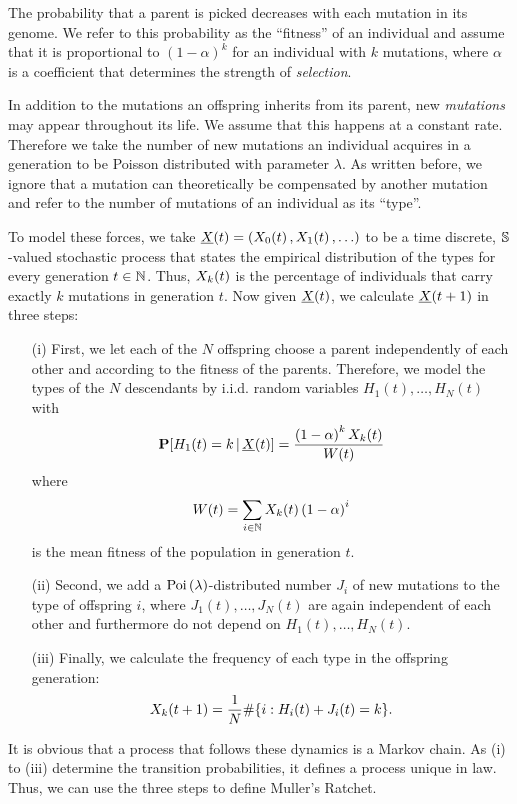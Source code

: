 The probability that a parent is picked decreases with each mutation in its genome. We refer to
this probability as the ``fitness'' of an individual and assume that it is proportional to
$(1-\alpha)^k$ for an individual with $k$ mutations, where $\alpha$ is a coefficient that determines
the strength of \emph{selection}.

In addition to the mutations an offspring inherits from its parent, new
\emph{mutations} may appear throughout its life. We assume that this happens at a constant rate. Therefore we take the
number of new mutations an individual acquires in a generation to be Poisson distributed with
parameter $\lambda$. As written before, we ignore that a mutation can
theoretically be compensated by another mutation and refer to the number of
mutations of an individual as its ``type''.

To model these forces, we take $\underline{X}\!\left(t\right) = \left( X_{0} \! \left( t \right),X_{1} \! \left( t \right),\ldots \right)$ to be a
time discrete, $\mathbb{S}$-valued stochastic process that states the empirical distribution of the
types for every generation $t \in \mathbb{N}$. Thus, $X_{k} \! \left( t \right)$ is the percentage of individuals that
carry exactly $k$ mutations in generation $t$. Now given $\underline{X}\!\left(t\right)$, we calculate
$\underline{X}\!\left(t+1\right)$ in three steps:

\begin{itemize}
  \item[(i)] First, we let each of the $N$ offspring choose a parent independently of each other
  and according to the fitness of the parents. Therefore, we model the types of the
  $N$ descendants by i.i.d. random variables $H_1(t),\ldots,H_N(t)$ with
  \[ \mathbf{P} \! \left[  H_1(t) = k \, | \, \underline{X}\!\left(t\right)  \right] = \frac{\left( 1-\alpha \right)^k X_k(t)}{W(t)} \] 
  where
  \[ W(t) = \sum_{i \in \mathbb{N}} X_{k} \! \left( t \right)\left(1-\alpha\right)^i \]
  is the mean fitness of the population in generation $t$.
  \item[(ii)] Second, we add a $\text{Poi} \left( \lambda \right)$-distributed number $J_i$ of new
  mutations to the type of offspring $i$, where $J_1(t),\ldots,J_N(t)$ are again independent of each
  other and furthermore do not depend on $H_1(t),\ldots,H_N(t)$.
  \item[(iii)] Finally, we calculate the frequency of each type in the offspring generation:
  \[ X_{k} \! \left( t+1 \right) = \frac{1}{N} \# \{ i : H_i(t) + J_i(t) = k \}. \]
\end{itemize}

\noindent
It is obvious that a process that follows these dynamics is a Markov chain. As (i) to (iii)
determine the transition probabilities, it defines a process unique in law. Thus, we can use the
three steps to define Muller's Ratchet.


